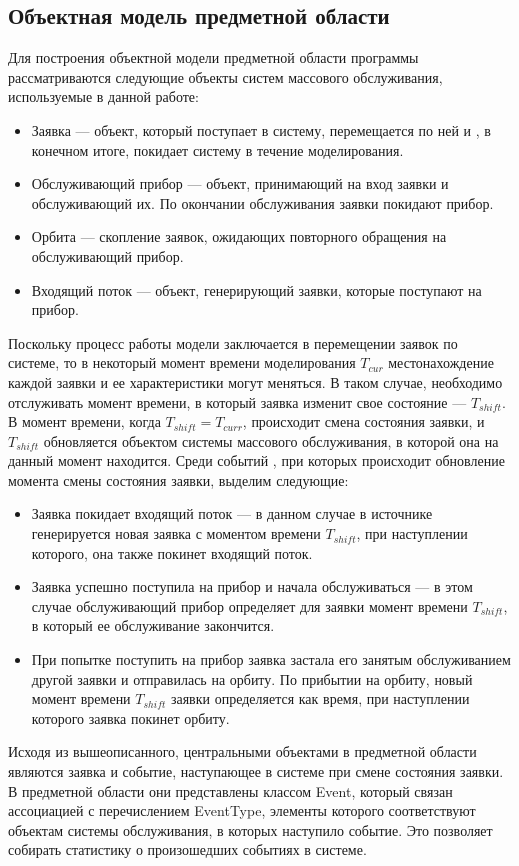 \subsection {Объектная модель предметной области}
Для построения объектной модели предметной области программы рассматриваются следующие объекты систем массового обслуживания, используемые в данной работе:
\begin{itemize}
\item Заявка --- объект, который поступает в систему, перемещается по ней и , в конечном итоге, покидает систему в течение моделирования.
\item Обслуживающий прибор --- объект, принимающий на вход заявки и обслуживающий их. По окончании обслуживания заявки покидают прибор.
\item Орбита --- скопление заявок, ожидающих повторного обращения на обслуживающий прибор.
\item Входящий поток --- объект, генерирующий заявки, которые поступают на прибор.
	\end{itemize}
 Поскольку процесс работы модели заключается в перемещении заявок по системе, то в некоторый момент времени моделирования $T_{cur}$ местонахождение каждой заявки и ее характеристики могут меняться. В таком случае, необходимо отслуживать момент времени, в который заявка изменит свое состояние --- $T_{shift}$. В момент времени, когда $T_{shift} = T_{curr}$,  происходит смена состояния заявки, и  $T_{shift}$ обновляется объектом системы массового обслуживания, в которой она на данный момент находится. Среди событий , при которых происходит обновление момента смены состояния заявки, выделим следующие:
\begin{itemize}
	\item Заявка покидает входящий поток --- в данном случае в источнике генерируется новая заявка с моментом времени $T_{shift}$, при наступлении которого, она также покинет входящий поток.
	\item Заявка успешно поступила на прибор и начала обслуживаться --- в этом случае обслуживающий прибор определяет для заявки момент времени $T_{shift}$, в который ее обслуживание закончится.
	\item При попытке поступить на прибор заявка застала его занятым обслуживанием другой заявки и отправилась на орбиту. По прибытии на орбиту, новый момент времени $T_{shift}$ заявки определяется как время, при наступлении которого заявка покинет орбиту.
\end{itemize}
Исходя из вышеописанного, центральными объектами в предметной области являются заявка и событие, наступающее в системе при смене состояния заявки. В предметной области они представлены классом Event, который связан ассоциацией с перечислением EventType, элементы которого соответствуют объектам системы обслуживания, в которых наступило  событие. Это позволяет собирать статистику о произошедших событиях в системе.
